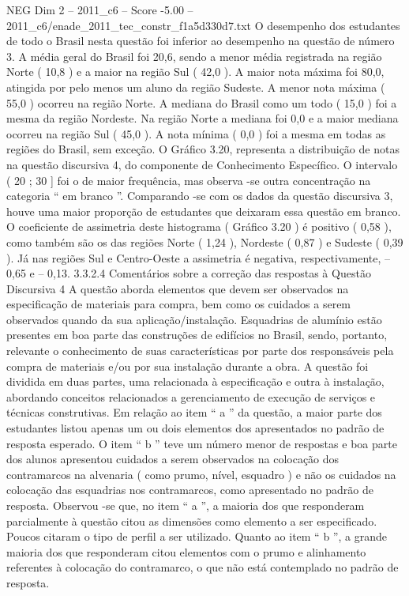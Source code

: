 \begin{textsample}{NEG Dim 2 – 2011\_c6 – Score -5.00 – 2011\_c6/enade\_2011\_tec\_constr\_f1a5d330d7.txt}
O desempenho dos estudantes de todo o Brasil nesta questão foi inferior ao desempenho na questão de número 3.
A média geral do Brasil foi 20,6, sendo a menor média registrada na região Norte ( 10,8 ) e a maior na região Sul ( 42,0 ).
A maior nota máxima foi 80,0, atingida por pelo menos um aluno da região Sudeste.
A menor nota máxima ( 55,0 ) ocorreu na região Norte.
A mediana do Brasil como um todo ( 15,0 ) foi a mesma da região Nordeste.
Na região Norte a mediana foi 0,0 e a maior mediana ocorreu na região Sul ( 45,0 ).
A nota mínima ( 0,0 ) foi a mesma em todas as regiões do Brasil, sem exceção.
O Gráfico 3.20, representa a distribuição de notas na questão discursiva 4, do componente de Conhecimento Específico.
O intervalo ( 20 ; 30 ] foi o de maior frequência, mas observa -se outra concentração na categoria “ em branco ”.
Comparando -se com os dados da questão discursiva 3, houve uma maior proporção de estudantes que deixaram essa questão em branco.
O coeficiente de assimetria deste histograma ( Gráfico 3.20 ) é positivo ( 0,58 ), como também são os das regiões Norte ( 1,24 ), Nordeste ( 0,87 ) e Sudeste ( 0,39 ).
Já nas regiões Sul e Centro-Oeste a assimetria é negativa, respectivamente, – 0,65 e – 0,13. 3.3.2.4 Comentários sobre a correção das respostas à Questão Discursiva 4 A questão aborda elementos que devem ser observados na especificação de materiais para compra, bem como os cuidados a serem observados quando da sua aplicação/instalação.
Esquadrias de alumínio estão presentes em boa parte das construções de edifícios no Brasil, sendo, portanto, relevante o conhecimento de suas características por parte dos responsáveis pela compra de materiais e/ou por sua instalação durante a obra.
A questão foi dividida em duas partes, uma relacionada à especificação e outra à instalação, abordando conceitos relacionados a gerenciamento de execução de serviços e técnicas construtivas.
Em relação ao item “ a ” da questão, a maior parte dos estudantes listou apenas um ou dois elementos dos apresentados no padrão de resposta esperado.
O item “ b ” teve um número menor de respostas e boa parte dos alunos apresentou cuidados a serem observados na colocação dos contramarcos na alvenaria ( como prumo, nível, esquadro ) e não os cuidados na colocação das esquadrias nos contramarcos, como apresentado no padrão de resposta.
Observou -se que, no item “ a ”, a maioria dos que responderam parcialmente à questão citou as dimensões como elemento a ser especificado.
Poucos citaram o tipo de perfil a ser utilizado.
Quanto ao item “ b ”, a grande maioria dos que responderam citou elementos com o prumo e alinhamento referentes à colocação do contramarco, o que não está contemplado no padrão de resposta.

\end{textsample}
